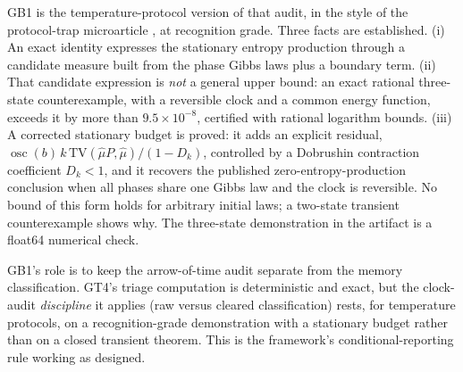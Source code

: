 GB1 is the temperature-protocol version of that audit, in the style of the protocol-trap
microarticle , at recognition grade. Three facts are established. (i) An
exact identity expresses the stationary entropy production through a candidate measure built from
the phase Gibbs laws plus a boundary term. (ii) That candidate expression is \emph{not} a general
upper bound: an exact rational three-state counterexample, with a reversible clock and a common
energy function, exceeds it by more than $9.5\times10^{-8}$, certified with rational logarithm
bounds. (iii) A corrected stationary budget is proved: it adds an explicit residual,
$\operatorname{osc}(b)\,k\,\mathrm{TV}(\hat\mu P,\hat\mu)/(1-D_k)$, controlled by a Dobrushin
contraction coefficient $D_k<1$, and it recovers the published zero-entropy-production conclusion
when all phases share one Gibbs law and the clock is reversible. No bound of this form holds for
arbitrary initial laws; a two-state transient counterexample shows why. The three-state
demonstration in the artifact is a float64 numerical check.

GB1's role is to keep the arrow-of-time audit separate from the memory classification. GT4's triage
computation is deterministic and exact, but the clock-audit \emph{discipline} it applies (raw
versus cleared classification) rests, for temperature protocols, on a recognition-grade
demonstration with a stationary budget rather than on a closed transient theorem. This is the
framework's conditional-reporting rule working as designed.
